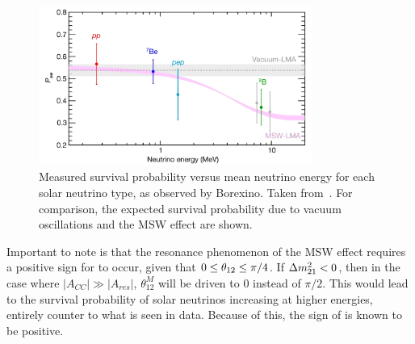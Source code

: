 \begin{figure}
    \centering
    \includegraphics[width=0.8\textwidth]{1_NeutrinoTheory/Figs/borexino_pee_energy_plot.png}
    \caption[Measured survival probability versus mean neutrino energy for each solar neutrino type, as observed by Borexino]{Measured survival probability versus mean neutrino energy for each solar neutrino type, as observed by Borexino. Taken from~\cite{agostiniComprehensiveMeasurementPpchain2018}. For comparison, the expected survival probability due to vacuum oscillations and the MSW effect are shown.}
    \label{fig:pee_solar_data}
\end{figure}

Important to note is that the resonance phenomenon of the MSW effect requires a positive sign for \dmsq{} to occur, given that $0\leq\theta_{12}{}\leq\pi/4$. If $\Delta m^{2}_{21}{}<0$, then in the case where $|A_{CC}|\gg |A_{res}|$, $\theta_{12}^{M}$ will be driven to 0 instead of $\pi/2$. This would lead to the survival probability of solar neutrinos increasing at higher energies, entirely counter to what is seen in data. Because of this, the sign of \dmsq{} is known to be positive.



